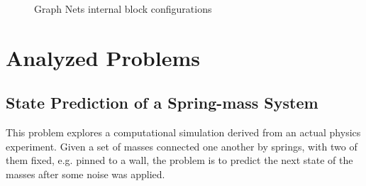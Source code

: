 \begin{figure}[!htb]
    \centering
    
    \caption{Graph Nets internal block configurations ~\cite{Battaglia_2018}}
    
    \label{fig:graph_nets_flexibility}
\end{figure}




\section{Analyzed Problems}


\subsection{State Prediction of a Spring-mass System}

This problem explores a computational simulation derived from an actual physics experiment. Given a set of masses connected one another by springs, with two of them fixed, e.g. pinned to a wall, the problem is to predict the next state of the masses after  some noise was applied.

